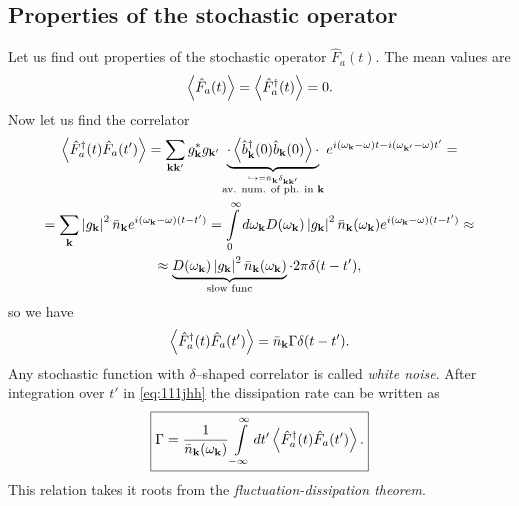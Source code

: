 \subsection{Properties of the stochastic operator}

Let us find out properties of the stochastic operator $\hat{F}_a(t)$. The mean values are
\begin{equation}
	\left\langle {\hat{F}_a(t)} \right\rangle = \left\langle {\hat{F}_a^{\dagger}(t)} \right\rangle = 0.
\end{equation}
Now let us find the correlator
\begin{multline}
	\left\langle {\hat{F}_a^{\dagger}(t) \hat{F}_a(t')} \right\rangle = \sum_{\mathbf{k} \mathbf{k}'} g^*_{\mathbf{k}} g_{\mathbf{k}'} \underbrace{\cdot \left\langle {\hat{b}_{\mathbf{k}}^{\dagger}(0) \hat{b}_{\mathbf{k}}(0)} \right\rangle \cdot }_{\overset{\hookrightarrow=\bar{n}_{\mathbf{k}} \delta_{\mathbf{k}\mathbf{k}'}}{\text{av. num. of ph. in } \mathbf{k}}} e^{i(\omega_{\mathbf{k}} - \omega)t - i(\omega_{\mathbf{k}'} - \omega)t'} = \\ 
	= \sum_{\mathbf{k}} \left| g_{\mathbf{k}}\right|^2 \bar{n}_{\mathbf{k}} e^{i (\omega_{\mathbf{k}} - \omega)(t - t')} = \int \limits_0^{\infty} d \omega_{\mathbf{k}} D(\omega_{\mathbf{k}}) \left| g_{\mathbf{k}}\right|^2 \bar{n}_{\mathbf{k}} (\omega_{\mathbf{k}}) e^{i (\omega_{\mathbf{k}} - \omega)(t - t')} \approx \\ \approx \underbrace{D(\omega_{\mathbf{k}}) \left| g_{\mathbf{k}}\right|^2 \bar{n}_{\mathbf{k}} (\omega_{\mathbf{k}})}_{\text{slow func}} \cdot 2\pi \delta(t-t'),
\end{multline}
so we have
\begin{equation}
	\left\langle {\hat{F}_a^{\dagger}(t) \hat{F}_a(t')} \right\rangle = \bar{n}_{\mathbf{k}} \Gamma \delta(t - t').
	\label{eq:111jhh}
\end{equation}
Any stochastic function with $\delta$--shaped correlator is called \textit{white noise}. After integration over $t'$ in \eqref{eq:111jhh} the dissipation rate  can be written as
\begin{equation}
	\boxed{\Gamma = \frac{1}{\bar{n}_{\mathbf{k}}(\omega_{\mathbf{k}})} \int \limits_{-\infty}^{\infty} dt' \left\langle {\hat{F}_a^{\dagger}(t) \hat{F}_a(t')} \right\rangle.}
\end{equation}
This relation takes it roots from the \textit{fluctuation-dissipation theorem}.

